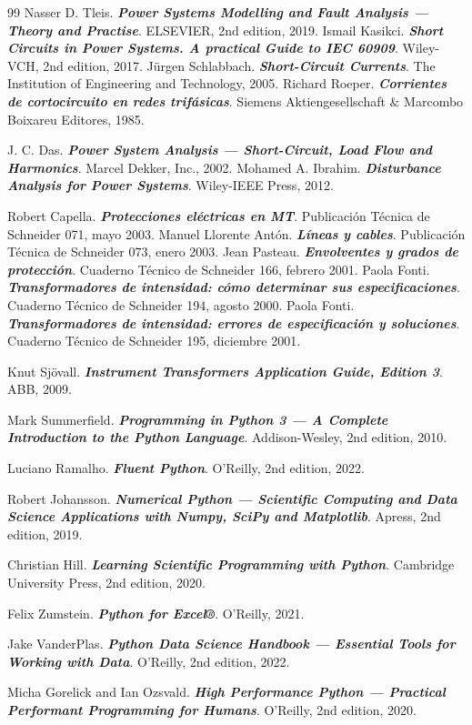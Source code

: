 \begin{thebibliography}{99}
     Nasser D. Tleis. \textbf{\textit{Power Systems Modelling and Fault Analysis --- Theory and Practise}}.  ELSEVIER, 2nd edition, 2019.
     Ismail Kasikci. \textbf{\textit{Short Circuits in Power Systems. A practical Guide to IEC 60909}}.  Wiley-VCH, 2nd edition, 2017.
     Jürgen Schlabbach. \textbf{\textit{Short-Circuit Currents}}.  The Institution of Engineering and Technology, 2005.
     Richard Roeper. \textbf{\textit{Corrientes de cortocircuito en redes trifásicas}}.  Siemens Aktiengesellschaft \& Marcombo Boixareu Editores, 1985.

     J. C. Das. \textbf{\textit{Power System Analysis --- Short-Circuit, Load Flow and Harmonics}}. Marcel Dekker, Inc., 2002.
     Mohamed A. Ibrahim. \textbf{\textit{Disturbance Analysis for Power Systems}}. Wiley-IEEE Press, 2012.

     Robert Capella. \textbf{\textit{Protecciones eléctricas en MT}}.  Publicación Técnica de Schneider 071, mayo 2003.
     Manuel Llorente Antón. \textbf{\textit{Líneas y cables}}.  Publicación Técnica de Schneider 073, enero 2003.
     Jean Pasteau. \textbf{\textit{Envolventes y grados de protección}}.  Cuaderno Técnico de Schneider 166, febrero 2001.
     Paola Fonti. \textbf{\textit{Transformadores de intensidad: cómo determinar sus especificaciones}}.  Cuaderno Técnico de Schneider 194, agosto 2000.
     Paola Fonti. \textbf{\textit{Transformadores de intensidad: errores de especificación y soluciones}}.  Cuaderno Técnico de Schneider 195, diciembre 2001.

     Knut Sjövall. \textbf{\textit{Instrument Transformers Application Guide, Edition 3}}.  ABB, 2009.
    
     Mark Summerfield. \textbf{\textit{Programming in Python 3 --- A Complete Introduction to the Python Language}}.  Addison-Wesley, 2nd edition, 2010.
    
     Luciano Ramalho. \textbf{\textit{Fluent Python}}.  O'Reilly, 2nd edition, 2022.
    	
     Robert Johansson. \textbf{\textit{Numerical
    		Python --- Scientific Computing and Data Science Applications with Numpy,
    		SciPy and Matplotlib}}.  Apress, 2nd edition, 2019.
    
     Christian Hill. \textbf{\textit{Learning Scientific Programming with Python}}.  Cambridge University Press, 2nd edition,  2020.
    
      Felix Zumstein. \textbf{\textit{Python for Excel®}}.  O'Reilly, 2021.
        
      Jake VanderPlas. \textbf{\textit{Python Data Science Handbook --- Essential Tools for Working with Data}}.  O'Reilly, 2nd edition, 2022.
     
      Micha Gorelick and Ian Ozsvald. \textbf{\textit{High Performance Python --- Practical Performant Programming for Humans}}.  O'Reilly, 2nd edition, 2020.

\end{thebibliography}
